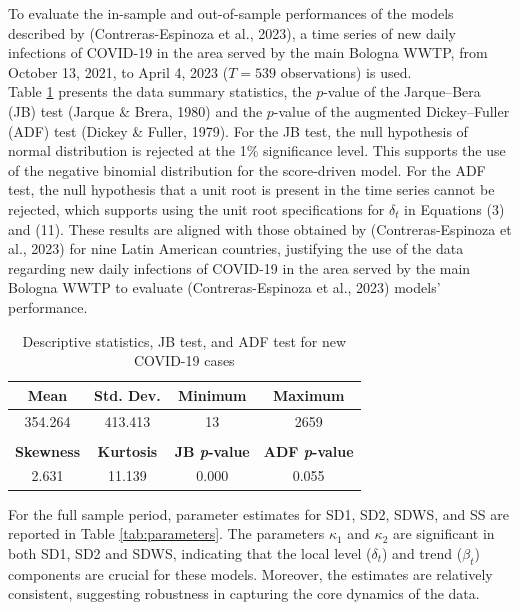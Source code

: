 To evaluate the in-sample and out-of-sample performances of the models described by (Contreras-Espinoza et al., 2023), a time series of new daily infections of COVID-19 in the area served by the main Bologna WWTP, from October 13, 2021, to April 4, 2023 ($T = 539$ observations) is used. \\

Table \ref{tab:descr_stat} presents the data summary statistics, the $p$-value of the Jarque–Bera (JB) test (Jarque \& Brera, 1980) and the $p$-value of the augmented Dickey–Fuller (ADF) test (Dickey \& Fuller, 1979). For the JB test, the null hypothesis of normal distribution is rejected at the 1\% significance level. This supports the use of the negative binomial distribution for the score-driven model. For the ADF test, the null hypothesis that a unit root is present in the time series cannot be rejected, which supports using the unit root specifications for $\delta_t$ in Equations (3) and (11). These results are aligned with those obtained by (Contreras-Espinoza et al., 2023) for nine Latin American countries, justifying the use of the data regarding new daily infections of COVID-19 in the area served by the main Bologna WWTP to evaluate (Contreras-Espinoza et al., 2023) models' performance.\\

\begin{table}[h!]
\centering
\caption{Descriptive statistics, JB test, and ADF test for new COVID-19 cases}
\centering
\renewcommand{\arraystretch}{1.5}
\begin{tabular}[h]{c c c c}
\hline
\textbf{Mean} & \textbf{Std. Dev.} & \textbf{Minimum} & \textbf{Maximum} \\
\hline
354.264 & 413.413 & 13 & 2659 \\
\hline
& & & \\
\hline
\textbf{Skewness} & \textbf{Kurtosis} & \textbf{JB \textit{p}-value} & \textbf{ADF \textit{p}-value} \\
\hline
2.631 & 11.139 & 0.000 & 0.055\\
\hline
\end{tabular}
\label{tab:descr_stat}
\end{table}
\vspace{0.4cm}

For the full sample period, parameter estimates for SD1, SD2, SDWS, and SS are reported in Table \ref{tab:parameters}. The parameters $\kappa_1$ and $\kappa_2$ are significant in both SD1, SD2 and SDWS, indicating that the local level ($\delta_t$) and trend ($\beta_t$) components are crucial for these models. Moreover, the estimates are relatively consistent, suggesting robustness in capturing the core dynamics of the data. \\

